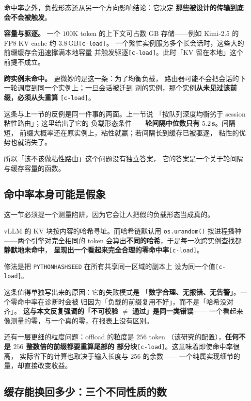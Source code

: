 命中率之外，负载形态还从另一个方向影响结论：它决定
\textbf{那些被设计的传输到底会不会被触发}。

\noindent\textbf{容量与驱逐。} 一个 $100$K token 的上下文可占数 GB
存储——例如 Kimi-2.5 的 FP8 KV cache 约 $3.8$\,GB\texttt{[c-load]}。
一个繁忙实例服务多个长会话时，这些大的前缀缓存会迅速撑满本地容量
并触发驱逐\texttt{[c-load]}。此时「KV 留在本地」这个前提不成立。

\noindent\textbf{跨实例未命中。} 更微妙的是这一条：为了均衡负载，
路由器可能不会把会话的下一轮调度到同一个实例上；一旦会话被迁到
别的实例，那个实例\textbf{从未见过该前缀，必须从头重算}
\texttt{[c-load]}。

\noindent 这条与上一节的反例是同一件事的两面。上一节说
「按队列深度均衡劣于 session 粘性路由」；这里给出了它的
负载形态条件——\textbf{轮间隔中位数只有 $5.2$\,s}。间隔短，
前缀大概率还在原实例上，粘性就赢；若间隔长到缓存已被驱逐，
粘性的优势也就消失了。

\noindent 所以「该不该做粘性路由」这个问题没有独立答案，
它的答案是一个关于轮间隔与缓存容量的函数。

\subsection{命中率本身可能是假象}

这一节必须提一个测量陷阱，因为它会让人把假的负载形态当成真的。

\noindent vLLM 的 KV 块按内容的哈希寻址。而哈希链默认用
\texttt{os.urandom()} 按进程播种——两个引擎对完全相同的 token
会算出\textbf{不同的哈希}，于是每一次跨实例查找都\textbf{静默地未命中}，
\textbf{呈现出一个看起来完全合理的零命中率}\texttt{[c-load]}。

\noindent 修法是把 \texttt{PYTHONHASHSEED} 在所有共享同一区域的副本上
设为同一个值\texttt{[c-load]}。

\noindent 这条值得单独写出来的原因：它的失败模式是
「\textbf{数字合理、无报错、无告警}」。一个零命中率在诊断时会被
归因为「负载的前缀复用不好」，而不是「哈希没对齐」。
\textbf{这与本文反复强调的「不可校验 $\neq$ 通过」是同一类错误}——
一个看起来像测量的零，与一个真的零，在报表上没有区别。

\noindent 还有一层更细的粒度问题：offload 的粒度是 $256$ token
（该研究的配置），\textbf{任何不是 $256$ 整数倍的前缀都要重算尾部的
部分块}\texttt{[c-load]}。这意味着即使命中率很高，
实际省下的计算也取决于输入长度与 $256$ 的余数——
一个纯属实现细节的量，却直接改变收益。

\subsection{缓存能换回多少：三个不同性质的数}

